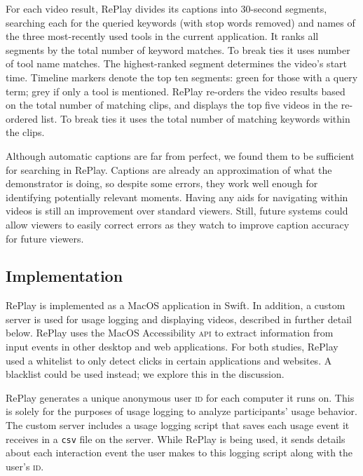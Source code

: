 For each video result, RePlay divides its captions into 30-second segments, searching each for the queried keywords (with stop words removed) and names of the three most-recently used tools in the current application. It ranks all segments by the total number of keyword matches. To break ties it uses number of tool name matches. The highest-ranked segment determines the video's start time. Timeline markers denote the top ten segments: green for those with a query term; grey if only a tool is mentioned. RePlay re-orders the video results based on the total number of matching clips, and displays the top five videos in the re-ordered list. To break ties it uses the total number of matching keywords within the clips.

Although automatic captions are far from perfect, we found them to be sufficient for searching in RePlay. Captions are already an approximation of what the demonstrator is doing, so despite some errors, they work well enough for identifying potentially relevant moments. Having any aids for navigating within videos is still an improvement over standard viewers. Still, future systems could allow viewers to easily correct errors as they watch to improve caption accuracy for future viewers.

\subsection{Implementation}
RePlay is implemented as a Mac\-OS application in Swift. In addition, a custom server is used for usage logging and displaying videos, described in further detail below. RePlay uses the Mac\-OS Accessibility \textsc{api} to extract information from input events in other desktop and web applications. For both studies, RePlay used a whitelist to only detect clicks in certain applications and websites. A blacklist could be used instead; we explore this in the discussion.

RePlay generates a unique anonymous user \textsc{id} for each computer it runs on. This is solely for the purposes of usage logging to analyze participants' usage behavior. The custom server includes a usage logging script that saves each usage event it receives in a \texttt{csv} file on the server. While RePlay is being used, it sends details about each interaction event the user makes to this logging script along with the user's \textsc{id}. 

